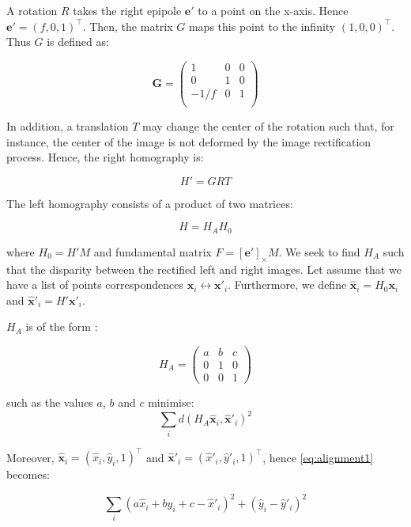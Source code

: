 \documentclass[11pt]{report}
\begin{document}
A rotation $R$ takes the right epipole $\mathbf{e}'$ to a point on the x-axis. Hence $\mathbf{e}' = (f, 0, 1)^\top$. Then, the matrix $G$ maps this point to the infinity $(1, 0, 0)^\top$. Thus $G$ is defined as:

\[
    \mathbf{G} = \left (
    \begin{matrix}
        1 & 0 & 0 \\
        0 & 1 & 0 \\
        -1/f & 0 & 1 \\
    \end{matrix}
    \right )
\]

In addition, a translation $T$ may change the center of the rotation such that, for instance, the center of the image is not deformed by the image rectification process. Hence, the right homography is:

\begin{equation}
  H' = GRT
\end{equation}

The left homography consists of a product of two matrices:

\begin{equation}
  H = H_AH_0
\end{equation}

where $H_0 = H'M$ and fundamental matrix $F=[\mathbf{e}']_\times M$. We seek to find $H_A$ such that the disparity between the rectified left and right images. Let assume that we have a list of points correspondences $\mathbf{x}_i \leftrightarrow \mathbf{x}'_i$. Furthermore, we define $\hat{\mathbf{x}}_i = H_0\mathbf{x}_i$ and $\hat{\mathbf{x}}'_i = H'\mathbf{x}'_i$.

$H_A$ is of the form :

\[
    H_A = \left (
\begin{matrix}
    a & b & c \\
    0 & 1 & 0 \\
    0 & 0 & 1
\end{matrix}
\right )
\]

such as the values $a$, $b$ and $c$ minimise:
\begin{equation}
    \label{eq:alignment1}
    \sum_i d(H_A\hat{\mathbf{x}}_i, \hat{\mathbf{x}}'_i)^2
\end{equation}

Moreover, $\hat{\mathbf{x}}_i = (\hat{x}_i, \hat{y}_i, 1)^\top$ and $\hat{\mathbf{x}}'_i = (\hat{x}'_i, \hat{y}'_i, 1)^\top$, hence \ref{eq:alignment1} becomes:

\begin{equation}
    \sum_i (a\hat{x}_i + b\hat{y}_i + c - \hat{x}'_i)^2 + (\hat{y}_i - \hat{y}'_i)^2
    \label{eq:alignment2}
\end{equation}
\end{document}
